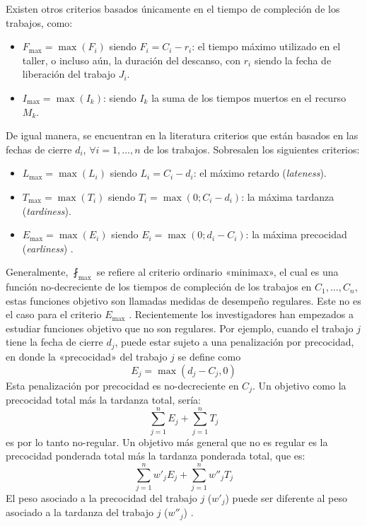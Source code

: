 \documentclass[spanish,draft,12pt,headsepline,footsepline,paper=letter]{scrreprt}
\begin{document}
Existen otros criterios basados únicamente en el tiempo de compleción de los trabajos, como:

\begin{itemize}
\item$F_{\max} = \max(F_i)$ siendo $F_i = C_i - r_i$: el tiempo máximo utilizado en el taller, o incluso aún, la duración del descanso, con $r_i$ siendo la fecha de liberación del trabajo $J_i$.
\item$I_{\max} = \max(I_k)$: siendo $I_k$ la suma de los tiempos muertos en el recurso $M_k$.
\end{itemize}
%
De igual manera, se encuentran en la literatura criterios que están basados en las fechas de cierre $d_i$, $\forall i = 1,\dots,n$ de los trabajos. Sobresalen los siguientes criterios:
%
\begin{itemize}
  \item $L_{\max} = \max(L_i)$ siendo $L_i = C_i - d_i$: el máximo retardo (\textit{lateness}).
  \item $T_{\max} = \max(T_i)$ siendo $T_i = \max(0; C_i - d_i)$: la máxima tardanza (\textit{tardiness}).
  \item $E_{\max} = \max(E_i)$ siendo $E_i = \max(0; d_i - C_i)$: la máxima precocidad (\textit{earliness}) \citep[p.~13]{TKindt2002}.
\end{itemize}

Generalmente, $\fint_{\max}$ se refiere al criterio ordinario «minimax», el cual es una función no\nobreakdash-decreciente de los tiempos de compleción de los trabajos en $C_1,\dots,C_n$, estas funciones objetivo son llamadas medidas de desempeño regulares. Este no es el caso para el criterio $E_{\max}$ \citep[p.~13]{TKindt2002}. Recientemente los investigadores han empezados a estudiar funciones objetivo que no son regulares. Por ejemplo, cuando el trabajo $j$ tiene la fecha de cierre $d_j$, puede estar sujeto a una penalización por precocidad, en donde la «precocidad» del trabajo $j$ se define como 
\[ E_j = \max (d_j - C_j, 0) \]
Esta penalización por precocidad es no\nobreakdash-decreciente en $C_j$. Un objetivo como la precocidad total más la tardanza total, sería:
\[ \sum_{j=1}^{n}E_{j}+\sum_{j=1}^{n}T_{j} \]
es por lo tanto no\nobreakdash-regular. Un objetivo más general que no es regular es la precocidad ponderada total más la tardanza ponderada total, que es:
\[ \sum_{j=1}^{n}w'_jE_{j}+\sum_{j=1}^{n}w''_jT_{j} \]
El peso asociado a la precocidad del trabajo $j$ ($w'_j$) puede ser diferente al peso asociado a la tardanza del trabajo $j$ ($w''_j$) \citep[p.~19]{Pinedo1995}.
\end{document}
